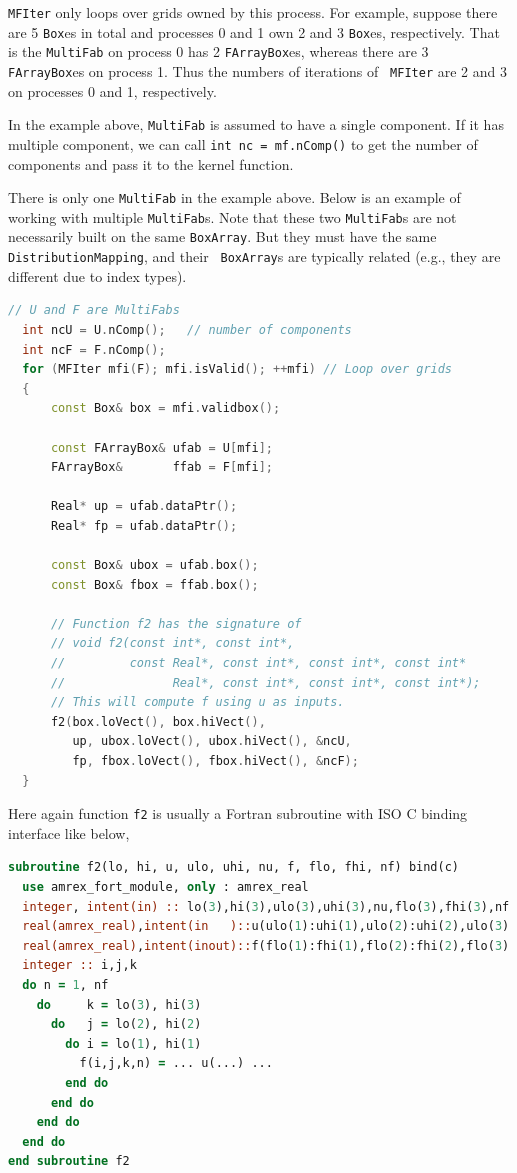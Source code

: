{{{\tt MFIter} only loops over grids owned by this process.  For
example, suppose there are 5 {\tt Box}es in total and processes 0 and
1 own 2 and 3 {\tt Box}es, respectively.  That is the {\tt MultiFab}
on process 0 has 2 {\tt FArrayBox}es, whereas there are 3 {\tt
  FArrayBox}es on process 1.  Thus the numbers of iterations of {\tt
  MFIter} are 2 and 3 on processes 0 and 1, respectively.

In the example above, {\tt MultiFab} is assumed to have a single
component.  If it has multiple component, we can call {\tt int nc =
  mf.nComp()} to get the number of components and pass it to the
kernel function.

There is only one {\tt MultiFab} in the example above.  Below is an
example of working with multiple {\tt MultiFab}s.  Note that these two
{\tt MultiFab}s are not necessarily built on the same {\tt BoxArray}.
But they must have the same {\tt DistributionMapping}, and their {\tt
  BoxArray}s are typically related (e.g., they are different due to
index types).
\begin{lstlisting}[language=cpp]
  // U and F are MultiFabs
  int ncU = U.nComp();   // number of components
  int ncF = F.nComp();
  for (MFIter mfi(F); mfi.isValid(); ++mfi) // Loop over grids
  {
      const Box& box = mfi.validbox();

      const FArrayBox& ufab = U[mfi];
      FArrayBox&       ffab = F[mfi];

      Real* up = ufab.dataPtr();
      Real* fp = ufab.dataPtr();

      const Box& ubox = ufab.box();
      const Box& fbox = ffab.box();

      // Function f2 has the signature of 
      // void f2(const int*, const int*,
      //         const Real*, const int*, const int*, const int*
      //               Real*, const int*, const int*, const int*);
      // This will compute f using u as inputs.
      f2(box.loVect(), box.hiVect(),
         up, ubox.loVect(), ubox.hiVect(), &ncU,
         fp, fbox.loVect(), fbox.hiVect(), &ncF);
  }
\end{lstlisting}
Here again function {\tt f2} is usually a Fortran subroutine with ISO
C binding interface like below,
\begin{lstlisting}[language=fortran]
subroutine f2(lo, hi, u, ulo, uhi, nu, f, flo, fhi, nf) bind(c)
  use amrex_fort_module, only : amrex_real
  integer, intent(in) :: lo(3),hi(3),ulo(3),uhi(3),nu,flo(3),fhi(3),nf
  real(amrex_real),intent(in   )::u(ulo(1):uhi(1),ulo(2):uhi(2),ulo(3):uhi(3),nu)
  real(amrex_real),intent(inout)::f(flo(1):fhi(1),flo(2):fhi(2),flo(3):fhi(3),nf)
  integer :: i,j,k
  do n = 1, nf
    do     k = lo(3), hi(3)
      do   j = lo(2), hi(2)
        do i = lo(1), hi(1)
          f(i,j,k,n) = ... u(...) ...
        end do
      end do
    end do
  end do
end subroutine f2
\end{lstlisting}

}}
